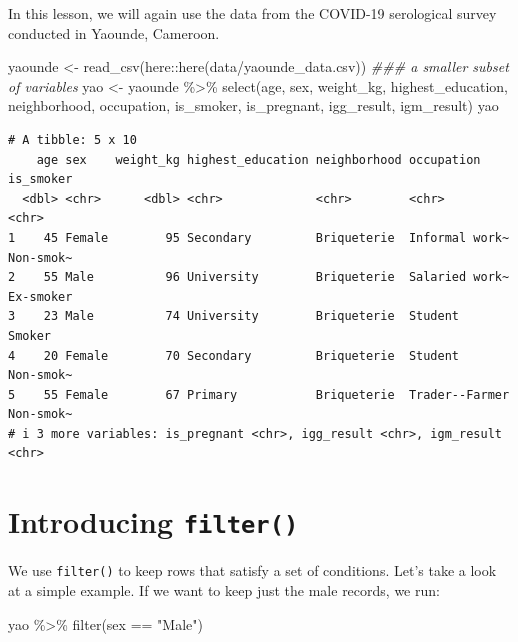 \documentclass[
  letterpaper,
  DIV=11,
  numbers=noendperiod]{scrreprt}
\newenvironment{Shaded}{\begin{snugshade}}{\end{snugshade}}
\newcommand{\DocumentationTok}[1]{\textcolor[rgb]{0.37,0.37,0.37}{\textit{#1}}}
\newcommand{\FunctionTok}[1]{\textcolor[rgb]{0.28,0.35,0.67}{#1}}
\newcommand{\NormalTok}[1]{\textcolor[rgb]{0.00,0.23,0.31}{#1}}
\newcommand{\OtherTok}[1]{\textcolor[rgb]{0.00,0.23,0.31}{#1}}
\newcommand{\SpecialCharTok}[1]{\textcolor[rgb]{0.37,0.37,0.37}{#1}}
\newcommand{\StringTok}[1]{\textcolor[rgb]{0.13,0.47,0.30}{#1}}
\begin{document}
In this lesson, we will again use the data from the COVID-19 serological
survey conducted in Yaounde, Cameroon.

\begin{Shaded}
\begin{Highlighting}[]
\NormalTok{yaounde }\OtherTok{\textless{}{-}} \FunctionTok{read\_csv}\NormalTok{(here}\SpecialCharTok{::}\FunctionTok{here}\NormalTok{(}\StringTok{\textquotesingle{}data/yaounde\_data.csv\textquotesingle{}}\NormalTok{))}
\DocumentationTok{\#\#\# a smaller subset of variables}
\NormalTok{yao }\OtherTok{\textless{}{-}}\NormalTok{ yaounde }\SpecialCharTok{\%\textgreater{}\%} 
  \FunctionTok{select}\NormalTok{(age, sex, weight\_kg, highest\_education, neighborhood, }
\NormalTok{         occupation, is\_smoker, is\_pregnant, }
\NormalTok{         igg\_result, igm\_result)}
\NormalTok{yao}
\end{Highlighting}
\end{Shaded}

\begin{verbatim}
# A tibble: 5 x 10
    age sex    weight_kg highest_education neighborhood occupation     is_smoker
  <dbl> <chr>      <dbl> <chr>             <chr>        <chr>          <chr>    
1    45 Female        95 Secondary         Briqueterie  Informal work~ Non-smok~
2    55 Male          96 University        Briqueterie  Salaried work~ Ex-smoker
3    23 Male          74 University        Briqueterie  Student        Smoker   
4    20 Female        70 Secondary         Briqueterie  Student        Non-smok~
5    55 Female        67 Primary           Briqueterie  Trader--Farmer Non-smok~
# i 3 more variables: is_pregnant <chr>, igg_result <chr>, igm_result <chr>
\end{verbatim}

\section{\texorpdfstring{Introducing
\texttt{filter()}}{Introducing filter()}}\label{introducing-filter}

We use \texttt{filter()} to keep rows that satisfy a set of conditions.
Let's take a look at a simple example. If we want to keep just the male
records, we run:

\begin{Shaded}
\begin{Highlighting}[]
\NormalTok{yao }\SpecialCharTok{\%\textgreater{}\%} \FunctionTok{filter}\NormalTok{(sex }\SpecialCharTok{==} \StringTok{"Male"}\NormalTok{)}
\end{Highlighting}
\end{Shaded}
\end{document}
